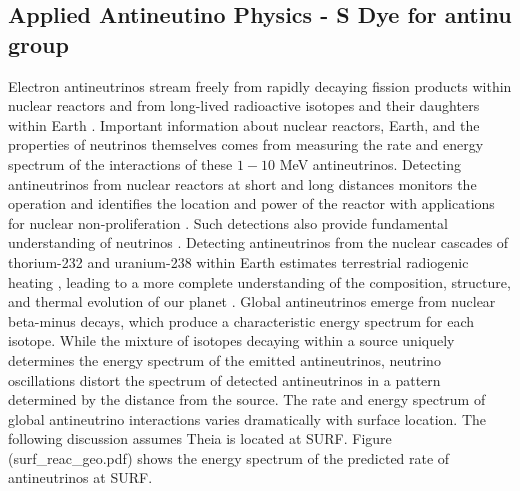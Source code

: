 \subsection{Applied Antineutino Physics - S Dye for antinu group}
Electron antineutrinos stream freely from rapidly decaying fission products within nuclear reactors and from long-lived radioactive isotopes and their daughters within Earth \cite{agm15}. Important information about nuclear reactors, Earth, and the properties of neutrinos themselves comes from measuring the rate and energy spectrum of the interactions of these $1-10$ MeV antineutrinos. Detecting antineutrinos from nuclear reactors at short \cite{nucifer15,songs07} and long \cite{nudar13,snif10} distances monitors the operation and identifies the location and power of the reactor with applications for nuclear non-proliferation \cite{adam10}. Such detections also provide fundamental understanding of neutrinos \cite{reines53,reines76,jgl08}. Detecting antineutrinos from the nuclear cascades of thorium-232 and uranium-238 within Earth \cite{kl05} estimates terrestrial radiogenic heating \cite{gando13,agostini15}, leading to a more complete understanding of the composition, structure, and thermal evolution of our planet \cite{dye_etal15}. Global antineutrinos emerge from nuclear beta-minus decays, which produce a characteristic energy spectrum for each isotope. While the mixture of isotopes decaying within a source uniquely determines the energy spectrum of the emitted antineutrinos, neutrino oscillations distort the spectrum of detected antineutrinos in a pattern determined by the distance from the source. The rate and energy spectrum of global antineutrino interactions varies dramatically with surface location. The following discussion assumes Theia is located at SURF. Figure (surf_reac_geo.pdf) shows the energy spectrum of the predicted rate of antineutrinos at SURF.

